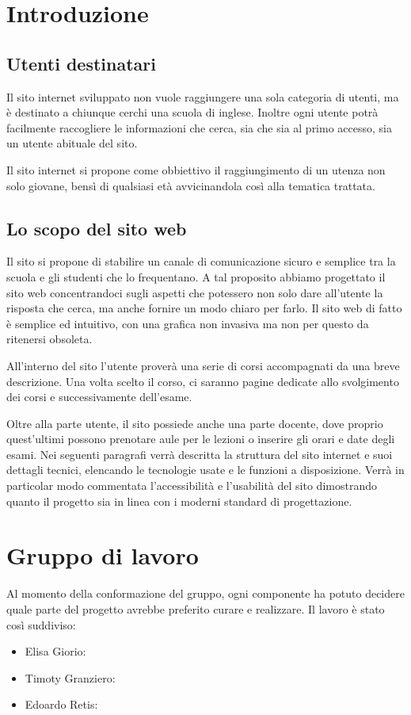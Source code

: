 \documentclass[12pt, a4paper]{article}
\begin{document}
\section{Introduzione}

\subsection{Utenti destinatari}
Il sito internet sviluppato non vuole raggiungere una sola categoria di utenti, ma è destinato a chiunque cerchi una scuola di inglese.  Inoltre ogni utente potrà facilmente raccogliere le informazioni che cerca, sia che sia al primo accesso, sia un utente abituale del sito.\par
Il sito internet si propone come obbiettivo il raggiungimento di un utenza non solo giovane, bensì di qualsiasi età avvicinandola così alla tematica trattata.

\subsection{Lo scopo del sito web}
Il sito si propone di stabilire un canale di comunicazione sicuro e semplice tra la scuola e gli studenti che lo frequentano. A tal proposito abbiamo progettato il sito web concentrandoci sugli aspetti che potessero non solo dare all’utente la risposta che cerca, ma anche fornire un modo chiaro per farlo. Il sito web di fatto è semplice ed intuitivo, con una grafica non invasiva ma non per questo da ritenersi obsoleta.\par
\bigskip
All’interno del sito l’utente proverà una serie di corsi accompagnati da una breve descrizione. Una volta scelto il corso, ci saranno pagine dedicate allo svolgimento dei corsi e successivamente dell’esame.\par
\bigskip
Oltre alla parte utente, il sito possiede anche una parte docente, dove proprio quest’ultimi possono prenotare aule per le lezioni o inserire gli orari e date degli esami.
Nei seguenti paragrafi verrà descritta la struttura del sito internet e suoi dettagli tecnici, elencando le tecnologie usate e le funzioni a disposizione. Verrà in particolar modo commentata l’accessibilità e l’usabilità del sito dimostrando quanto il progetto sia in linea con i moderni standard di progettazione.

\section{Gruppo di lavoro}
Al momento della conformazione del gruppo, ogni componente ha potuto decidere quale parte del progetto avrebbe preferito curare e realizzare. 
Il lavoro è stato così suddiviso:
\begin{itemize}
	\item Elisa Giorio:
	\item Timoty Granziero:
	\item Edoardo Retis:
\end{itemize}
\end{document}
